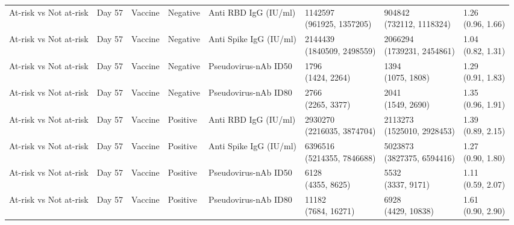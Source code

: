 \documentclass[]{book}
\theoremstyle{definition}
\theoremstyle{definition}
\theoremstyle{definition}
\newcommand{\1}{\mathbbm{1}}
\begin{document}
\begin{landscape}
\begin{ThreePartTable}
\begin{longtable}[t]{>{\raggedright\arraybackslash}p{2.7cm}lllllll}
\addlinespace
At-risk vs Not at-risk & Day 57 & Vaccine & Negative & Anti RBD IgG (IU/ml) & \makecell[l]{1142597\\(961925, 1357205)} & \makecell[l]{904842\\(732112, 1118324)} & \makecell[l]{1.26\\(0.96, 1.66)}\\
At-risk vs Not at-risk & Day 57 & Vaccine & Negative & Anti Spike IgG (IU/ml) & \makecell[l]{2144439\\(1840509, 2498559)} & \makecell[l]{2066294\\(1739231, 2454861)} & \makecell[l]{1.04\\(0.82, 1.31)}\\
At-risk vs Not at-risk & Day 57 & Vaccine & Negative & Pseudovirus-nAb ID50 & \makecell[l]{1796\\(1424, 2264)} & \makecell[l]{1394\\(1075, 1808)} & \makecell[l]{1.29\\(0.91, 1.83)}\\
At-risk vs Not at-risk & Day 57 & Vaccine & Negative & Pseudovirus-nAb ID80 & \makecell[l]{2766\\(2265, 3377)} & \makecell[l]{2041\\(1549, 2690)} & \makecell[l]{1.35\\(0.96, 1.91)}\\
At-risk vs Not at-risk & Day 57 & Vaccine & Positive & Anti RBD IgG (IU/ml) & \makecell[l]{2930270\\(2216035, 3874704)} & \makecell[l]{2113273\\(1525010, 2928453)} & \makecell[l]{1.39\\(0.89, 2.15)}\\
\addlinespace
At-risk vs Not at-risk & Day 57 & Vaccine & Positive & Anti Spike IgG (IU/ml) & \makecell[l]{6396516\\(5214355, 7846688)} & \makecell[l]{5023873\\(3827375, 6594416)} & \makecell[l]{1.27\\(0.90, 1.80)}\\
At-risk vs Not at-risk & Day 57 & Vaccine & Positive & Pseudovirus-nAb ID50 & \makecell[l]{6128\\(4355, 8625)} & \makecell[l]{5532\\(3337, 9171)} & \makecell[l]{1.11\\(0.59, 2.07)}\\
At-risk vs Not at-risk & Day 57 & Vaccine & Positive & Pseudovirus-nAb ID80 & \makecell[l]{11182\\(7684, 16271)} & \makecell[l]{6928\\(4429, 10838)} & \makecell[l]{1.61\\(0.90, 2.90)}\\

\end{longtable}
\end{ThreePartTable}
\end{landscape}
\end{document}
